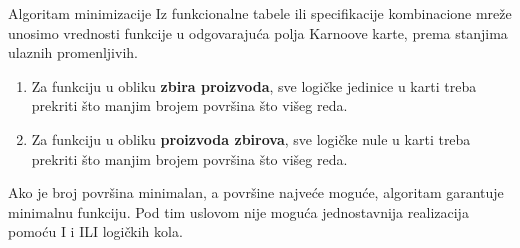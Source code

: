 \begin{frame}[label=02-s041]{Algoritam minimizacije}
\setlength{\parskip}{0pt}
Iz funkcionalne tabele ili specifikacije kombinacione mreže unosimo vrednosti funkcije u odgovarajuća polja Karnoove karte, prema stanjima ulaznih promenljivih.
\par\vspace{1.5mm}
\begin{enumerate}
\item Za funkciju u obliku \textbf{zbira proizvoda}, sve logičke jedinice u karti treba prekriti \alert{što manjim brojem površina što višeg reda}.
\item Za funkciju u obliku \textbf{proizvoda zbirova}, sve logičke nule u karti treba prekriti \alert{što manjim brojem površina što višeg reda}.
\end{enumerate}
\par\vspace{2mm}
\par\vspace{1mm}
Ako je broj površina minimalan, a površine najveće moguće, algoritam garantuje minimalnu funkciju. Pod tim uslovom nije moguća jednostavnija realizacija pomoću I i ILI logičkih kola.
\par\vspace{1.5mm}
\end{frame}
